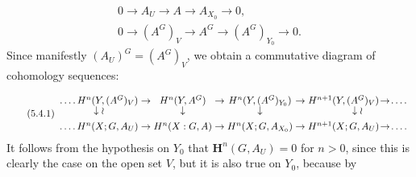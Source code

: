 \[
\begin{gathered}
0\to A_U\to A\to A_{X_0}\to0,\\
0\to(A^G)_V\to A^G\to
  (A^G)_{Y_0}\to0.
\end{gathered}
\]
Since manifestly $(A_U)^G=(A^G)_V$, we obtain a commutative diagram of
cohomology sequences:

\[
\tag{5.4.1}
\begin{array}{c@{\;}c@{\;}c@{\;}c@{\;}c@{\;}c@{\;}c}
\mathinner{.\,.\,.\,.}H^n(Y,(A^G)_V)&\to&H^n(Y,A^G)&\to&H^n(Y,(A^G)_{Y_0})&\to&
H^{n+1}(Y,(A^G)_V)\!\to\!\mathinner{.\,.\,.\,.}\\[-0.2em]
\downarrow\wr&&\downarrow&&\downarrow&&\downarrow\wr\\[0.45em]
\mathinner{.\,.\,.\,.}H^n(X;G,A_U)&\to&H^n(X:G,A)&\to&H^n(X;G,A_{X_0})&\to&
H^{n+1}(X;G,A_U)\!\to\!\mathinner{.\,.\,.\,.}
\end{array}
\]
It follows from the hypothesis on $Y_0$ that $\mathbf H^n(G,A_U)=0$ for
$n>0$, since this is clearly the case on the open set $V$, but it is also true
on $Y_0$, because by

